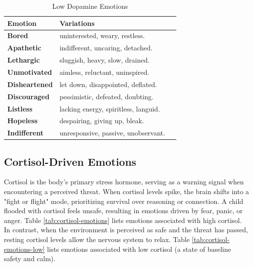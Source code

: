 \begin{table}[H]
\centering
\caption{Low Dopamine Emotions}
\begin{tabular}{@{}l p{0.7\linewidth}@{}}
\hline
\textbf{Emotion} & \textbf{Variations} \\
\hline
\textbf{Bored} & uninterested, weary, restless. \\
\textbf{Apathetic} & indifferent, uncaring, detached. \\
\textbf{Lethargic} & sluggish, heavy, slow, drained. \\
\textbf{Unmotivated} & aimless, reluctant, uninspired. \\
\textbf{Disheartened} & let down, disappointed, deflated. \\
\textbf{Discouraged} & pessimistic, defeated, doubting. \\
\textbf{Listless} & lacking energy, spiritless, languid. \\
\textbf{Hopeless} & despairing, giving up, bleak. \\
\textbf{Indifferent} & unresponsive, passive, unobservant. \\
\hline
\end{tabular}
\label{tab:dopamine-emotions-low}
\end{table}

\subsection{Cortisol-Driven Emotions}

Cortisol is the body's primary stress hormone, serving as a warning signal when encountering a perceived threat. 
When cortisol levels spike, the brain shifts into a "fight or flight" mode, prioritizing survival over reasoning or connection. 
A child flooded with cortisol feels unsafe, resulting in emotions driven by fear, panic, or anger. 
Table \ref{tab:cortisol-emotions} lists emotions associated with high cortisol. 
In contrast, when the environment is perceived as safe and the threat has passed, resting cortisol levels allow the nervous system to relax. 
Table \ref{tab:cortisol-emotions-low} lists emotions associated with low cortisol (a state of baseline safety and calm).

